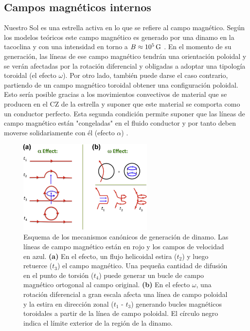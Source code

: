 \subsection{Campos magnéticos internos}
Nuestro Sol es una estrella activa en lo que se refiere al campo magnético. Según los modelos teóricos este campo magnético es generado por una dinamo en la tacoclina y con una intensidad en torno a $B\approx10^{5}\,\mathrm{G}$ \cite{Maeder2003a,Dudorov2014}. En el momento de su generación, las líneas de ese campo magnético tendrán una orientación poloidal y se verán afectadas por la rotación diferencial y obligadas a adoptar una tipología toroidal (el efecto $\omega$). Por otro lado, también puede darse el caso contrario, partiendo de un campo magnético toroidal obtener una configuración poloidal. Esto sería posible gracias a los movimientos convectivos de material que se producen en el CZ de la estrella y suponer que este material se comporta como un conductor perfecto. Esta segunda condición permite suponer que las líneas de campo magnético están "congeladas" en el fluido conductor y por tanto deben moverse solidariamente con él (efecto $\alpha$) \cite{Stanley2014}.\par

\begin{figure}
    \centering
    \includegraphics[width=0.6\textwidth]{img/tesis/alpha_omega_effect.png}
    \caption{Esquema de los mecanismos canónicos de generación de dinamo. Las líneas de campo magnético están en rojo y los campos de velocidad en azul. \textbf{(a)} En el efecto, un flujo helicoidal estira ($t_2$) y luego retuerce ($t_3$) el campo magnético. Una pequeña cantidad de difusión en el punto de torsión ($t_4$) puede generar un bucle de campo magnético ortogonal al campo original. \textbf{(b)} En el efecto $\omega$, una rotación diferencial a gran escala afecta una línea de campo poloidal y la estira en dirección zonal ($t_1$ - $t_3$) generando bucles magnéticos toroidales a partir de la línea de campo poloidal. El círculo negro indica el límite exterior de la región de la dinamo. \cite{Stanley2014}}
    \label{fig:alpha_omega_effect}
\end{figure}


